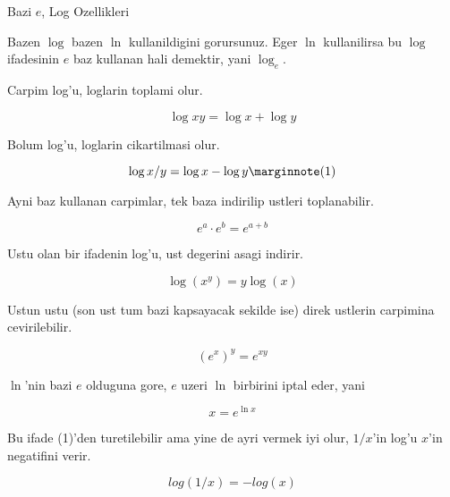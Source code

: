 \documentclass[12pt,fleqn]{article}\usepackage{../common}
\begin{document}
Bazi $e$, Log Ozellikleri

Bazen $\log$ bazen $\ln$ kullanildigini gorursunuz. Eger $\ln$
kullanilirsa bu $\log$ ifadesinin $e$ baz kullanan hali demektir, yani
$\log_e$. 

Carpim log'u, loglarin toplami olur.

\[ \log xy = \log x + \log y \]

Bolum log'u, loglarin cikartilmasi olur.

\[ \log x/y = \log x - \log y  
\mlabel{1}
\]

Ayni baz kullanan carpimlar, tek baza indirilip ustleri toplanabilir.

\[ e^a \cdot e^b = e^{a+b} \]

Ustu olan bir ifadenin log'u, ust degerini asagi indirir.

\[ \log(x^y) = y \log(x) \]

Ustun ustu (son ust tum bazi kapsayacak sekilde ise) direk ustlerin
carpimina cevirilebilir.

\[ (e^x)^y = e^{xy} \]

$\ln$'nin bazi $e$ olduguna gore, $e$ uzeri $\ln$ birbirini iptal eder,
yani

\[ x = e^{\ln x} \]

Bu ifade (1)'den turetilebilir ama yine de ayri vermek iyi olur, $1/x$'in
log'u $x$'in negatifini verir. 

\[ log(1/x) = -log(x) \]
\end{document}
